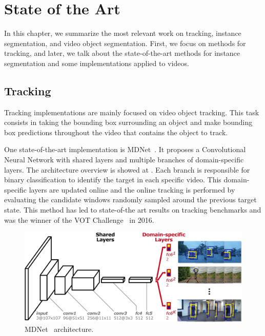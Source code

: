 
\chapter{State of the Art}
\label{cha:stateofart}

In this chapter, we summarize the most relevant work on tracking, instance segmentation, and video object segmentation.
First, we focus on methods for tracking, and later, we talk about the state-of-the-art methods for instance segmentation and some implementations applied to videos.

\section{Tracking}
\label{sec:soa_tracking}

Tracking implementations are mainly focused on video object tracking.
This task consists in taking the bounding box surrounding an object and make bounding box predictions throughout the video that contains the object to track.

One state-of-the-art implementation is MDNet~\mdnet{}.
It proposes a Convolutional Neural Network with shared layers and multiple branches of domain-specific layers.
The architecture overview is showed at .
Each branch is responsible for binary classification to identify the target in each specific video.
This domain-specific layers are updated online and the online tracking is performed by evaluating the candidate windows randomly sampled around the previous target state.
This method has led to state-of-the art results on tracking benchmarks and was the winner of the VOT Challenge~\votchallenge{} in 2016.

\begin{figure}[h]
  \centering
  \includegraphics[width=.8\linewidth]{figures/mdnet/architecture.png}
  \caption{MDNet~\mdnet{} architecture. }
  \label{fig:stateofart:mdnet}
\end{figure}

